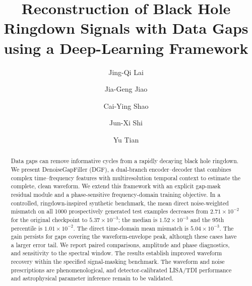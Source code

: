 \documentclass[10pt,prd,aps,a4paper,twocolumn,superscriptaddress,nofootinbib,floatfix]{revtex4-2}
\begin{document}
\title{Reconstruction of Black Hole Ringdown Signals with Data Gaps using a Deep-Learning Framework}
\author{Jing-Qi Lai}
\author{Jia-Geng Jiao}
\author{Cai-Ying Shao}

\author{Jun-Xi Shi}
\author{Yu Tian}

\begin{abstract}
Data gaps can remove informative cycles from a rapidly decaying black hole ringdown. We present DenoiseGapFiller (DGF), a dual-branch encoder--decoder that combines complex time--frequency features with multiresolution temporal context to estimate the complete, clean waveform. We extend this framework with an explicit gap-mask residual module and a phase-sensitive frequency-domain training objective. In a controlled, ringdown-inspired synthetic benchmark, the mean direct noise-weighted mismatch on all 1000 prospectively generated test examples decreases from $2.71\times10^{-2}$ for the original checkpoint to $5.37\times10^{-3}$; the median is $1.52\times10^{-3}$ and the 95th percentile is $1.01\times10^{-2}$. The direct time-domain mean mismatch is $5.04\times10^{-3}$. The gain persists for gaps covering the waveform-envelope peak, although these cases have a larger error tail. We report paired comparisons, amplitude and phase diagnostics, and sensitivity to the spectral window. The results establish improved waveform recovery within the specified signal-masking benchmark. The waveform and noise prescriptions are phenomenological, and detector-calibrated LISA/TDI performance and astrophysical parameter inference remain to be validated.
\end{abstract}
\maketitle
\end{document}

